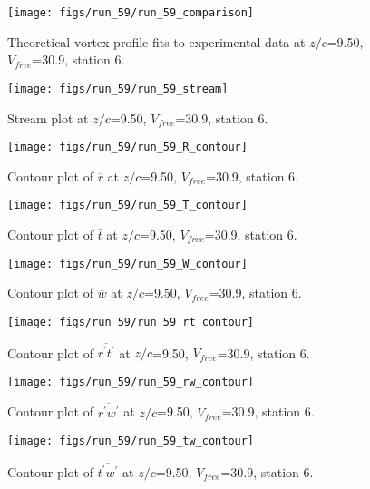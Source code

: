 \begin{figure}[H]
\centering
\texttt{[image: figs/run\_59/run\_59\_comparison]}
\caption{Theoretical vortex profile fits to experimental data at $z/c$=9.50, $V_{free}$=30.9, station 6.}
\label{fig:run_59_comparison}
\end{figure}


\begin{figure}[H]
\centering
\texttt{[image: figs/run\_59/run\_59\_stream]}
\caption{Stream plot at $z/c$=9.50, $V_{free}$=30.9, station 6.}
\label{fig:run_59_stream}
\end{figure}


\begin{figure}[H]
\centering
\texttt{[image: figs/run\_59/run\_59\_R\_contour]}
\caption{Contour plot of $\overline{r}$ at $z/c$=9.50, $V_{free}$=30.9, station 6.}
\label{fig:run_59_R_contour}
\end{figure}


\begin{figure}[H]
\centering
\texttt{[image: figs/run\_59/run\_59\_T\_contour]}
\caption{Contour plot of $\overline{t}$ at $z/c$=9.50, $V_{free}$=30.9, station 6.}
\label{fig:run_59_T_contour}
\end{figure}


\begin{figure}[H]
\centering
\texttt{[image: figs/run\_59/run\_59\_W\_contour]}
\caption{Contour plot of $\overline{w}$ at $z/c$=9.50, $V_{free}$=30.9, station 6.}
\label{fig:run_59_W_contour}
\end{figure}


\begin{figure}[H]
\centering
\texttt{[image: figs/run\_59/run\_59\_rt\_contour]}
\caption{Contour plot of $\overline{r^\prime t^\prime}$ at $z/c$=9.50, $V_{free}$=30.9, station 6.}
\label{fig:run_59_rt_contour}
\end{figure}


\begin{figure}[H]
\centering
\texttt{[image: figs/run\_59/run\_59\_rw\_contour]}
\caption{Contour plot of $\overline{r^\prime w^\prime}$ at $z/c$=9.50, $V_{free}$=30.9, station 6.}
\label{fig:run_59_rw_contour}
\end{figure}


\begin{figure}[H]
\centering
\texttt{[image: figs/run\_59/run\_59\_tw\_contour]}
\caption{Contour plot of $\overline{t^\prime w^\prime}$ at $z/c$=9.50, $V_{free}$=30.9, station 6.}
\label{fig:run_59_tw_contour}
\end{figure}


